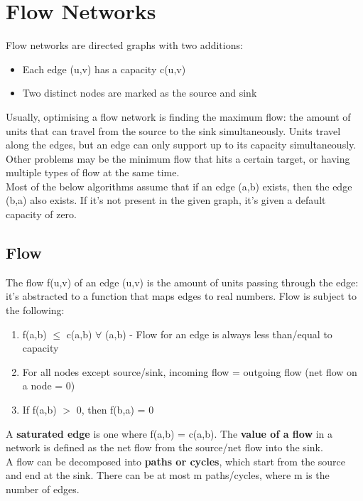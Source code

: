 \section{Flow Networks}
Flow networks are directed graphs with two additions:
\begin{itemize}
    \item Each edge (u,v) has a capacity c(u,v)
    \item Two distinct nodes are marked as the source and sink 
\end{itemize}
Usually, optimising a flow network is finding the maximum flow: the amount of units that can travel from the source to the sink simultaneously. Units travel along the edges, but an edge can only support up to its capacity simultaneously. Other problems may be the minimum flow that hits a certain target, or having multiple types of flow at the same time. \\
Most of the below algorithms assume that if an edge (a,b) exists, then the edge (b,a) also exists. If it's not present in the given graph, it's given a default capacity of zero.

\subsection{Flow}
The flow f(u,v) of an edge (u,v) is the amount of units passing through the edge: it's abstracted to a function that maps edges to real numbers. Flow is subject to the following:
\begin{enumerate}
    \item f(a,b) $\leq$ c(a,b) $\forall$ (a,b) - Flow for an edge is always less than/equal to capacity
    \item For all nodes except source/sink, incoming flow = outgoing flow (net flow on a node = 0)
    \item If f(a,b) $>$ 0, then f(b,a) = 0
\end{enumerate}
A \textbf{saturated edge} is one where f(a,b) = c(a,b). The \textbf{value of a flow} in a network is defined as the net flow from the source/net flow into the sink.\\
A flow can be decomposed into \textbf{paths or cycles}, which start from the source and end at the sink. There can be at most m paths/cycles, where m is the number of edges.

